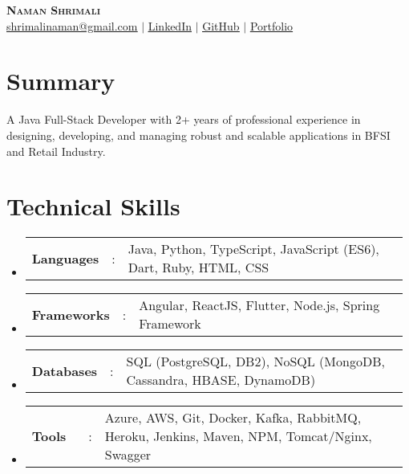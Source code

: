 \documentclass[a4paper,10pt]{article}
\newcommand{\resumeSectionType}[3]{
  \item\begin{tabular*}{0.96\textwidth}[t]{
    p{0.15\linewidth}p{0.02\linewidth}p{0.81\linewidth}
  }
    \textbf{#1} & #2 & #3
  \end{tabular*}\vspace{-2pt}
}
\newcommand{\resumeHeadingListStart}{
  \begin{itemize}[leftmargin=0.15in, label={}]
}
\newcommand{\resumeHeadingListEnd}{\end{itemize}}
\begin{document}


\begin{center}
  \textbf{\Huge \scshape Naman Shrimali} \\ \vspace{1pt}
  \href{mailto:shrimalinaman@gmail.com}{\uline{shrimalinaman@gmail.com}}
  $|$
  \href{https://www.linkedin.com/in/namanshrimali/}{\uline{LinkedIn}}
  $|$
  \href{https://github.com/namanshrimali}{\uline{GitHub}}
  $|$
  \href{https://namanshrimali.com}{\uline{Portfolio}}
\end{center}




\section{Summary}
\small{
  A Java Full-Stack Developer with 2+ years of professional experience in designing, developing, and managing robust and scalable applications in BFSI and Retail Industry. }

\vspace{-0.8\baselineskip}


\section{Technical Skills}
  \resumeHeadingListStart{}
    \resumeSectionType{Languages}{:}{Java, Python, TypeScript, JavaScript (ES6), Dart, Ruby, HTML, CSS}
    \resumeSectionType{Frameworks}{:}{Angular, ReactJS, Flutter, Node.js, Spring Framework}
    \resumeSectionType{Databases}{:}{SQL (PostgreSQL, DB2), NoSQL (MongoDB, Cassandra, HBASE, DynamoDB)}
    \resumeSectionType{Tools}{:}{Azure, AWS, Git, Docker, Kafka, RabbitMQ, Heroku, Jenkins, Maven, NPM, Tomcat/Nginx, Swagger}
  \resumeHeadingListEnd{}

\vspace{-0.8\baselineskip}


\end{document}
